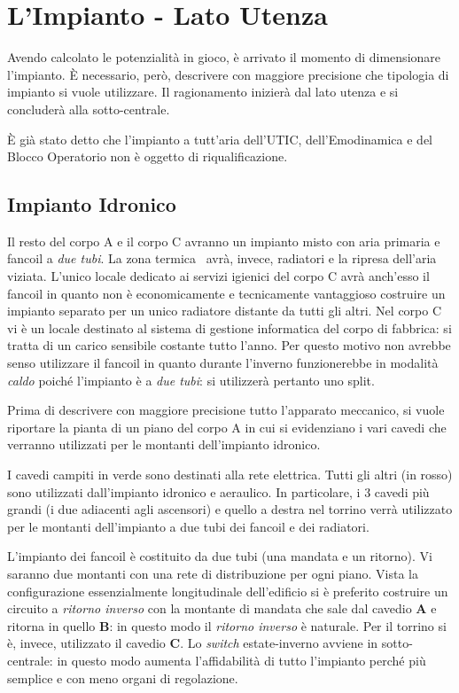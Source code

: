 \section{L'Impianto - Lato Utenza}
Avendo calcolato le potenzialità in gioco, è arrivato il momento di dimensionare l'impianto. È necessario, però, descrivere con maggiore precisione che tipologia di impianto si vuole utilizzare. Il ragionamento inizierà dal lato utenza e si concluderà alla sotto-centrale.

È già stato detto che l'impianto a tutt'aria dell'UTIC, dell'Emodinamica e del Blocco Operatorio non è oggetto di riqualificazione. 
\subsection{Impianto Idronico}
Il resto del corpo A e il corpo C avranno un impianto misto con aria primaria e fancoil a \emph{due tubi}. La zona termica \radd\ avrà, invece, radiatori e la ripresa dell'aria viziata. L'unico locale dedicato ai servizi igienici del corpo C avrà anch'esso il fancoil in quanto non è economicamente e tecnicamente vantaggioso costruire un impianto separato per un unico radiatore distante da tutti gli altri. Nel corpo C vi è un locale destinato al sistema di gestione informatica del corpo di fabbrica: si tratta di un carico sensibile costante tutto l'anno. Per questo motivo non avrebbe senso utilizzare il fancoil in quanto durante l'inverno funzionerebbe in modalità \emph{caldo} poiché l'impianto è a \emph{due tubi}: si utilizzerà pertanto uno split. 

Prima di descrivere con maggiore precisione tutto l'apparato meccanico, si vuole riportare la pianta di un piano del corpo A in cui si evidenziano i vari cavedi che verranno utilizzati per le montanti dell'impianto idronico.

I cavedi campiti in verde sono destinati alla rete elettrica. Tutti gli altri (in rosso) sono utilizzati dall'impianto idronico e aeraulico. In particolare, i 3 cavedi più grandi (i due adiacenti agli ascensori) e quello a destra nel torrino verrà utilizzato per le montanti dell'impianto a due tubi dei fancoil e dei radiatori. 

L'impianto dei fancoil è costituito da due tubi (una mandata e un ritorno). Vi saranno due montanti con una rete di distribuzione per ogni piano. Vista la configurazione essenzialmente longitudinale dell'edificio si è preferito costruire un circuito a \emph{ritorno inverso} con la montante di mandata che sale dal cavedio \textbf{A} e ritorna in quello \textbf{B}: in questo modo il \emph{ritorno inverso} è naturale. Per il torrino si è, invece, utilizzato il cavedio \textbf{C}. Lo \emph{switch} estate-inverno avviene in sotto-centrale: in questo modo aumenta l'affidabilità di tutto l'impianto perché più semplice e con meno organi di regolazione.

